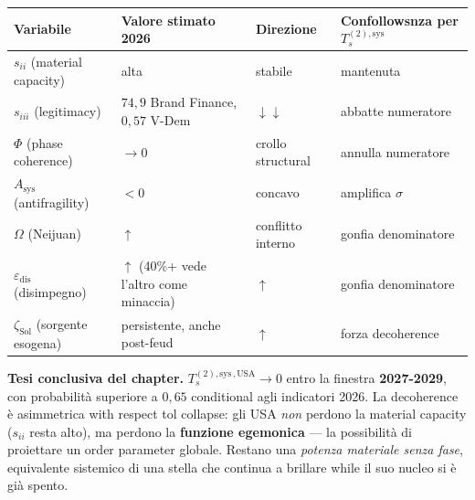 {\def\LTcaptype{none} %
{\small\begin{longtable}[]{@{}
  >{\raggedright\arraybackslash}p{}
  >{\raggedright\arraybackslash}p{}
  >{\raggedright\arraybackslash}p{}
  >{\raggedright\arraybackslash}p{}@{}}
\toprule\noalign{}
\begin{minipage}[b]{\linewidth}\raggedright
Variabile
\end{minipage} & \begin{minipage}[b]{\linewidth}\raggedright
Valore stimato 2026
\end{minipage} & \begin{minipage}[b]{\linewidth}\raggedright
Direzione
\end{minipage} & \begin{minipage}[b]{\linewidth}\raggedright
Confollowsnza per \(T_s^{(2),\text{sys}}\)
\end{minipage} \\
\midrule\noalign{}
\endhead
\bottomrule\noalign{}
\endlastfoot
\(s_{ii}\) (material capacity) & alta & stabile & mantenuta \\
\(s_{iii}\) (legitimacy) & \(74{,}9\) Brand Finance, \(0{,}57\) V-Dem &
\(\downarrow\downarrow\) & abbatte numeratore \\
\(\Phi\) (phase coherence) & \(\to 0\) & crollo structural & annulla
numeratore \\
\(A_{\text{sys}}\) (antifragility) & \(< 0\) & concavo & amplifica
\(\sigma\) \\
\(\Omega\) (Neijuan) & \(\uparrow\) & conflitto interno & gonfia
denominatore \\
\(\varepsilon_{\text{dis}}\) (disimpegno) & \(\uparrow\) (40\%+ vede
l'altro come minaccia) & \(\uparrow\) & gonfia denominatore \\
\(\zeta_{\text{Sol}}\) (sorgente esogena) & persistente, anche post-feud
& \(\uparrow\) & forza decoherence \\
\end{longtable}}
}

\Hypoth{} \textbf{Tesi conclusiva del chapter.}
\(T_s^{(2),\text{sys}\,,\text{USA}} \to 0\) entro la finestra
\textbf{2027-2029}, con probabilità superiore a \(0{,}65\) conditional
agli indicatori 2026. La decoherence è asimmetrica with respect tol collapse:
gli USA \emph{non} perdono la material capacity (\(s_{ii}\) resta
alto), ma perdono la \textbf{funzione egemonica} --- la possibilità di
proiettare un order parameter globale. Restano una \emph{potenza
materiale senza fase}, equivalente sistemico di una stella che continua
a brillare while il suo nucleo si è già spento.



